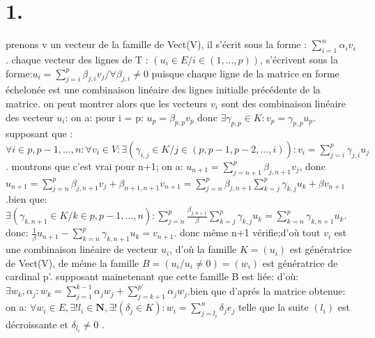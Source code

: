 \documentclass{article}
\begin{document}
\section*{1.}
\setlength{\marginparwidth}{50pt}
prenons v un vecteur de la famille de Vect(V), il s'écrit sous la forme : $\sum_{i=1}^{n}\alpha_{i}v_{i}$.\newline
chaque vecteur des lignes de T : $(u_i \in E/i \in (1,...,p))$, s'écrivent sous la forme:\newline $u_i = \sum_{j=i}^{p}\beta_{j,i}v_j /\forall\beta_{j,i} \neq 0 $ \newline puisque chaque ligne de la matrice en forme échelonée est une combinaison linéaire des lignes initialle précédente de la matrice.\newline
on peut montrer alors que les vecteurs $v_i$ sont des combinaison linéaire des vecteur $u_i$:\newline\newline
on a: pour i = p: $u_p = \beta_{p,p}v_p$ donc $\exists\gamma_{p,p}\in{K}: v_p = \gamma_{p,p}u_p$.\newline
supposant que :$\forall i \in{p,p-1,...,n} :\forall{v_i}\in{V}:\exists{(\gamma_{i,j}\in K/j\in(p,p-1,p-2,...,i))} : v_i = \sum_{j=i}^{p}\gamma_{j,i}u_j$. \newline montrons que c'est vrai pour n+1;\newline
on a: $u_{n+1}=\sum_{j=n+1}^{p}\beta_{j,n+1}v_j$, donc $u_{n+1} = \sum_{j=n}^{p}\beta_{j,n+1}v_j + \beta_{n+1,n+1}v_{n+1} = \sum_{j=n}^{p}\beta_{j,n+1}\sum_{k=j}^{p}\gamma_{k,j}u_k + \beta v_{n+1}$.\newline bien que:
\newline $\exists{(\gamma_{k,n+1}\in{K}/k\in{p,p-1,...,n})} : \sum_{j=n}^{p}\frac{\beta_{j,n+1}}{\beta}\sum_{k=j}^{p}\gamma_{k,j}u_k  = \sum_{k=n}^{p}\gamma_{k,n+1}u_k$.\newline
donc: $\frac{1}{\beta}u_{n+1} - \sum_{k=n}^{p}\gamma_{k,n+1}u_k = v_{n+1}$.\newline
donc même n+1 vérifie;\newline d'où tout $v_i$ est une combinaison linéaire de vecteur $u_i$, d'où la famille $K = (u_i)$ est génératrice de Vect(V), de méme la famille $B = (u_i/u_i \neq 0) = (w_i)$ est génératrice de cardinal p'.\newline\newline
supposant mainetenant que cette famille B est liée:\newline
d'où: $\exists{w_k},\alpha_j: w_k = \sum_{j=1}^{k-1} \alpha_jw_j +\sum_{j=k+1}^{p'} \alpha_jw_j$.\newline bien que d'aprés la matrice obtenue: on a: \newline $\forall{w_i}\in{E},\exists{!l_i\in\mathbf N},\exists!(\delta_j\in{K}): w_i = \sum_{j=l_i}^{n}\delta_j e_j$ telle que la suite $(l_i)$ est décroissante et $\delta_{l_i}\neq 0$ .\newline
\end{document}

